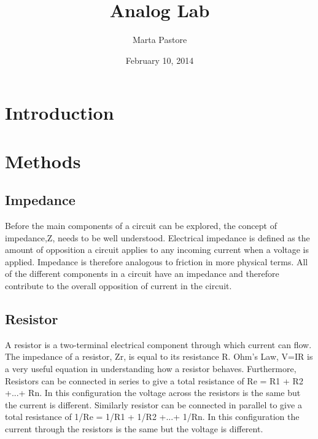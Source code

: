 \documentclass[12pt]{article}
\begin{document}
\title {Analog Lab}
\author {Marta Pastore}
\date {February 10, 2014}
\maketitle

\begin {abstract}

\end {abstract}

\section {Introduction}

\section {Methods}

\subsection {Impedance}

Before the main components of a circuit can be explored, the concept of
impedance,Z, needs to be well understood. Electrical impedance is
defined as the amount of opposition a circuit applies to any incoming
current when a voltage is applied. Impedance is therefore analogous to
friction in more physical terms. All of the different components in a
circuit have an impedance and therefore contribute to the overall
opposition of current in the circuit.

\subsection {Resistor}

A resistor is a two-terminal electrical component through which current
can flow. The impedance of a resistor, Zr, is equal to its resistance
R. Ohm's Law, V=IR is a very useful equation in understanding how a
resistor behaves. Furthermore, Resistors can be connected in series to
give a total resistance of Re  = R1 + R2 +...+ Rn. In this configuration
the voltage across the resistors is the same but the current is
different. Similarly resistor can be connected in parallel to give a
total resistance of 1/Re = 1/R1 + 1/R2 +...+ 1/Rn. In this configuration
the current through the resistors is the same but the voltage is
different.
\end{document}
